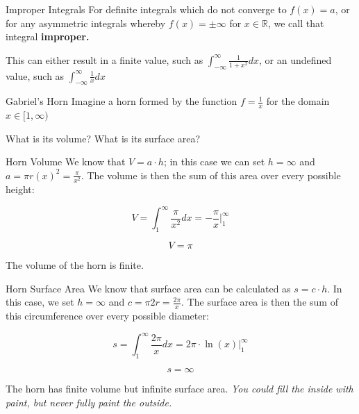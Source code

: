\documentclass[10pt]{beamer}
\begin{document}
\begin{frame}{Improper Integrals}
    For definite integrals which do not converge to $f(x) = a$, or for any asymmetric integrals whereby $f(x) = \pm \infty$ for $x \in \mathbb{R}$, we call that integral \textbf{improper.} \\

    \vspace{.5cm}

    This can either result in a finite value, such as $\int_{-\infty}^{\infty} \frac{1}{1+x^2}dx$, or an undefined value, such as $\int_{-\infty}^{\infty} \frac{1}{x} dx$
\end{frame}

\begin{frame}{Gabriel's Horn}
    Imagine a horn formed by the function $f = \frac{1}{x}$ for the domain $x \in [1, \infty)$

    What is its volume? What is its surface area?
\end{frame}

\begin{frame}{Horn Volume}
    We know that $V = a \cdot h$; in this case we can set $h = \infty$ and $a = \pi r(x)^2 =\frac{\pi}{x^2}$. The volume is then the sum of this area over every possible height:

    \[V = \int_1^\infty \frac{\pi}{x^2} dx = - \frac{\pi}{x} \bigg|_1^{\infty} \]

    \[V = \pi\]

    The volume of the horn is finite.
\end{frame}

\begin{frame}{Horn Surface Area}
    We know that surface area can be calculated as $s = c \cdot h$. In this case, we set $h = \infty$ and $c = \pi 2r = \frac{2\pi}{x}$. The surface area is then the sum of this circumference over every possible diameter:

    \[s = \int_1^{\infty} \frac{2 \pi}{x} dx = 2\pi \cdot \ln(x) \bigg|_1^{\infty}\]

    \[s = \infty\]

The horn has finite volume but infinite surface area. \textit{You could fill the inside with paint, but never fully paint the outside.}
\end{frame}
\end{document}
